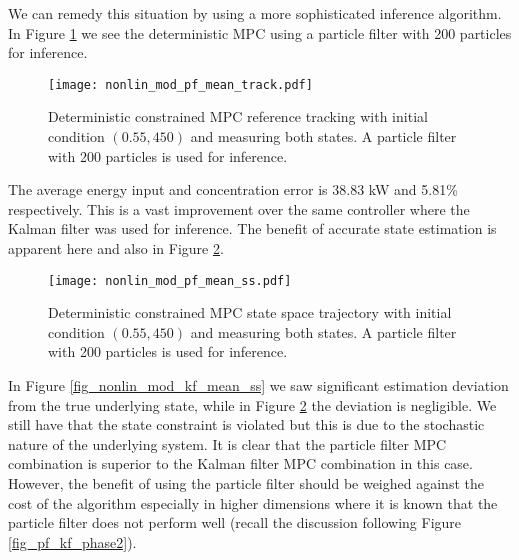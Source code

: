 We can remedy this situation by using a more sophisticated inference algorithm. In Figure \ref{fig_nonlin_mod_pf_mean_track} we see the deterministic MPC using a particle filter with 200 particles for inference. 
\begin{figure}[H] 
\centering
\texttt{[image: nonlin\_mod\_pf\_mean\_track.pdf]}
\caption{Deterministic constrained MPC reference tracking with initial condition $(0.55, 450)$ and measuring both states. A particle filter with 200 particles is used for inference.}
\label{fig_nonlin_mod_pf_mean_track}
\end{figure} 
The average energy input and concentration error is 38.83 kW and 5.81\% respectively. This is a vast improvement over the same controller where the Kalman filter was used for inference. The benefit of accurate state estimation is apparent here and also in Figure \ref{fig_nonlin_mod_pf_mean_ss}.
\begin{figure}[H] 
\centering
\texttt{[image: nonlin\_mod\_pf\_mean\_ss.pdf]}
\caption{Deterministic constrained MPC state space trajectory with initial condition $(0.55, 450)$ and measuring both states. A particle filter with 200 particles is used for inference.}
\label{fig_nonlin_mod_pf_mean_ss}
\end{figure}
In Figure \ref{fig_nonlin_mod_kf_mean_ss} we saw significant estimation deviation from the true underlying state, while in Figure \ref{fig_nonlin_mod_pf_mean_ss} the deviation is negligible. We still have that the state constraint is violated but this is due to the stochastic nature of the underlying system. It is clear that the particle filter MPC combination is superior to the Kalman filter MPC combination in this case. However, the benefit of using the particle filter should be weighed against the cost of the algorithm especially in higher dimensions where it is known that the particle filter does not perform well (recall the discussion following Figure \ref{fig_pf_kf_phase2}).

